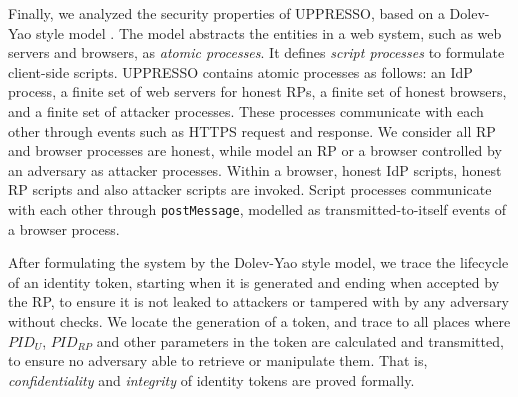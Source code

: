 

Finally, we analyzed the security properties of UPPRESSO, %
     based on a Dolev-Yao style model \cite{SPRESSO}.
The model abstracts the entities in a web system,
    such as web servers and browsers,
    as \emph{atomic processes}. %
It defines \emph{script processes} to formulate client-side scripts.
%
%
%
%
UPPRESSO contains atomic processes as follows:
an IdP process,
    a finite set of web servers for honest RPs, a finite set of honest browsers, and a finite set of attacker processes.
These processes communicate with each other through events such as HTTPS request and response.
We consider all RP and browser processes are honest,
 while model an RP or a browser controlled by an adversary as attacker processes.
Within a browser,
 honest IdP scripts, honest RP scripts and also attacker scripts are invoked.
Script processes communicate with each other through \verb+postMessage+,
    modelled as transmitted-to-itself events of a browser process.


After formulating the system by the Dolev-Yao style model,
    we trace the lifecycle of an identity token,
        starting when it is generated and ending when accepted by the RP,
 to ensure it is not leaked to attackers or tampered with by any adversary without checks.
We locate the generation of a token, and trace to all places
    where $PID_U$, $PID_{RP}$ and other parameters in the token are calculated and transmitted,
     to ensure no adversary able to retrieve or manipulate them.
That is, \emph{confidentiality} and \emph{integrity} of identity tokens are proved formally.


